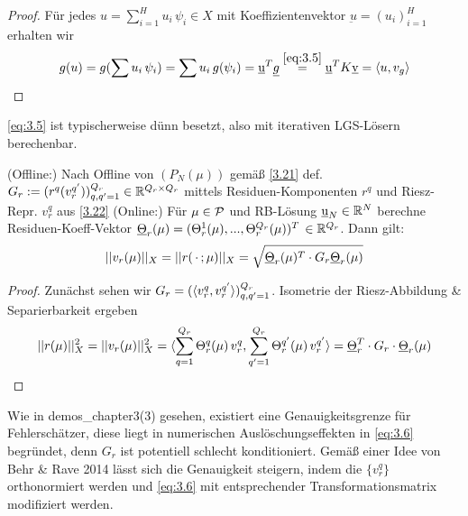 \begin{proof}
	Für jedes $u = \sum_{i=1}^H u_i \, \psi_i \in X$ mit Koeffizientenvektor $\underbar u = (u_i)_{i=1}^H$ erhalten wir
	\[
		g(u) = g(\sum u_i \, \psi_i) = \sum u_i \, g(\psi_i) = \underbar u^T \underline{g} \overset{\ref{eq:3.5}}{=} \underbar u^T K \underbar v = \langle u, v_g \rangle
	\] 
\end{proof}

\begin{bem}
	\ref{eq:3.5} ist typischerweise dünn besetzt, also mit iterativen LGS-Lösern berechenbar.
\end{bem}

\begin{kor}
\label{3.24}
	(Offline:) Nach Offline von $(P_N(\mu))$ gemäß \ref{3.21} def. $G_r := (r^q (v_r^{q'}))_{q,q' =1}^{Q_r} \in \mathbb{R}^{Q_r \times Q_r}$ mittels Residuen-Komponenten $r^q$ und Riesz-Repr. $v_r^q$ aus \ref{3.22}
	(Online:) Für $\mu \in \mathcal{P}$ und RB-Lösung $\underbar u_N \in \mathbb{R}^N$ berechne Residuen-Koeff-Vektor $\underline{\Theta}_r(\mu) = (\Theta_r^1(\mu),...,\Theta_r^{Q_r} (\mu))^T \, \in \mathbb{R}^{Q_r}$.
	Dann gilt: 
	\begin{align}
	||v_r(\mu)||_X = ||r(\,\cdot\,;\mu)||_X = \sqrt{\underline{\Theta}_r(\mu)^T \cdot G_r \underline{\Theta}_r(\mu)}
	\label{eq:3.6}
	\end{align}
\end{kor}

\begin{proof}
	Zunächst sehen wir $G_r = (\langle v_r^q, v_r^{q'} \rangle)_{q, q' = 1}^{Q_r}$. Isometrie der Riesz-Abbildung \& Separierbarkeit ergeben
	\[
		||r(\mu)||_X^2 = ||v_r(\mu)||_X^2 = \langle \sum_{q=1}^{Q_r} \Theta_r^q(\mu) \, v_r^q, \sum_{q'=1}^{Q_r} \Theta_r^{q'}(\mu) \, v_r^{q'} \rangle = \underline{\Theta}_r^T \cdot G_r \cdot \underline{\Theta}_r (\mu) 
	\]
\end{proof}

\begin{bem}
	Wie in \textsf{demos\_chapter3(3)} gesehen, existiert eine Genauigkeitsgrenze für Fehlerschätzer, diese liegt in numerischen Auslöschungseffekten in \ref{eq:3.6} begründet, denn $G_r$ ist potentiell schlecht konditioniert. Gemäß einer Idee von Behr \& Rave 2014 lässt sich die Genauigkeit steigern, indem die $\{v_r^q\}$ orthonormiert werden und \ref{eq:3.6} mit entsprechender Transformationsmatrix modifiziert werden.
\end{bem}

